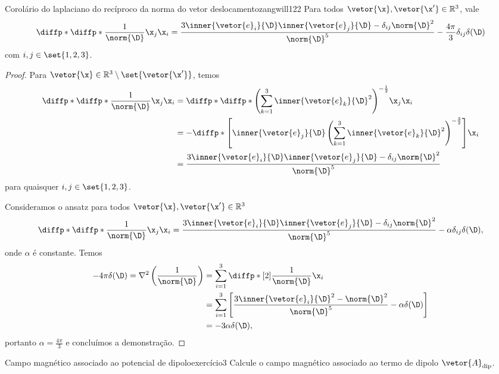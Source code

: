 \begin{lemma}{Corolário do laplaciano do recíproco da norma do vetor deslocamento}{zangwill122}
    Para todos \(\vetor{\x},\vetor{\x'} \in \mathbb{R}^3\), vale
    \begin{equation*}
        \diffp*{\diffp*{\frac{1}{\norm{\D}}}{\x_j}}{\x_i} = \frac{3\inner{\vetor{e}_i}{\D}\inner{\vetor{e}_j}{\D} - \delta_{ij}\norm{\D}^2}{\norm{\D}^5} - \frac{4\pi}{3}\delta_{ij}\delta(\D)
    \end{equation*}
    com \(i,j \in \set{1,2,3}\).
\end{lemma}
\begin{proof}
    Para \(\vetor{\x} \in \mathbb{R}^3 \setminus \set{\vetor{\x'}}\), temos
    \begin{align*}
        \diffp*{\diffp*{\frac{1}{\norm{\D}}}{\x_j}}{\x_i} &= \diffp*{\diffp*{\left(\sum_{k = 1}^3 \inner{\vetor{e}_k}{\D}^2\right)^{-\frac12}}{\x_j}}{\x_i}\\
                                                          &= -\diffp*{\left[\inner{\vetor{e}_j}{\D}\left(\sum_{k = 1}^3 \inner{\vetor{e}_k}{\D}^2\right)^{-\frac32}\right]}{\x_i}\\
                                                          &=\frac{3\inner{\vetor{e}_i}{\D}\inner{\vetor{e}_j}{\D} - \delta_{ij}\norm{\D}^2}{\norm{\D}^5}
    \end{align*}
    para quaisquer \(i,j \in \set{1,2,3}\).

    Consideramos o ansatz para todos \(\vetor{\x}, \vetor{\x'} \in \mathbb{R}^3\)
    \begin{equation*}
        \diffp*{\diffp*{\frac{1}{\norm{\D}}}{\x_j}}{\x_i} = \frac{3\inner{\vetor{e}_i}{\D}\inner{\vetor{e}_j}{\D} - \delta_{ij}\norm{\D}^2}{\norm{\D}^5} - \alpha \delta_{ij}\delta(\D),
    \end{equation*}
    onde \(\alpha\) é constante. Temos
    \begin{align*}
        -4\pi \delta(\D) = \nabla^2\left(\frac{1}{\norm{\D}}\right)
        &= \sum_{i = 1}^3 \diffp*[2]{\frac{1}{\norm{\D}}}{\x_i}\\
        &= \sum_{i = 1}^3 \left[\frac{3\inner{\vetor{e}_i}{\D}^2 - \norm{\D}^2}{\norm{\D}^5} - \alpha \delta(\D)\right]\\
        &= -3 \alpha \delta(\D),
    \end{align*}
    portanto \(\alpha = \frac{4\pi}{3}\) e concluímos a demonstração.
\end{proof}
\begin{exercício}{Campo magnético associado ao potencial de dipolo}{exercício3}
    Calcule o campo magnético associado ao termo de dipolo \(\vetor{A}_\mathrm{dip}\).
\end{exercício}
